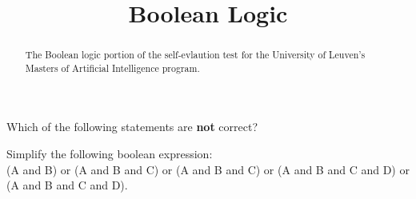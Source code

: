 \documentclass{ximera}
\title{Boolean Logic}
\begin{document}
\begin{abstract}
The Boolean logic portion of the self-evlaution test for the
University of Leuven's Masters of Artificial Intelligence program.
\end{abstract}
\maketitle


\begin{question}
Which of the following statements are \textbf{not} correct?
\begin{solution}
\begin{multiple-choice}
\end{multiple-choice}
\end{solution}
\end{question}

\begin{question}
Simplify the following boolean expression: \\
(A and B) or (A and B and C) or (A and B and C) or (A and B and C and D) or (A and B and C and D).
\begin{solution}
\begin{multiple-choice}
\end{multiple-choice}
\end{solution}
\end{question}
\end{document}

